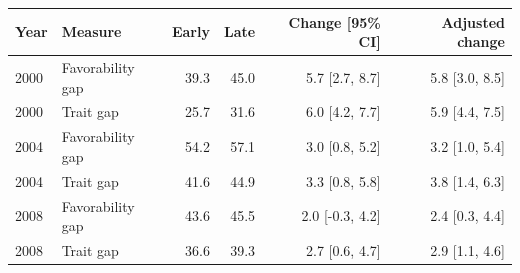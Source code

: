 \begin{tabular}{llrrrr}
\toprule
Year & Measure & Early & Late & Change [95\% CI] & Adjusted change \\
\midrule
2000 & Favorability gap & 39.3 & 45.0 & 5.7 [2.7, 8.7] & 5.8 [3.0, 8.5] \\
2000 & Trait gap & 25.7 & 31.6 & 6.0 [4.2, 7.7] & 5.9 [4.4, 7.5] \\
2004 & Favorability gap & 54.2 & 57.1 & 3.0 [0.8, 5.2] & 3.2 [1.0, 5.4] \\
2004 & Trait gap & 41.6 & 44.9 & 3.3 [0.8, 5.8] & 3.8 [1.4, 6.3] \\
2008 & Favorability gap & 43.6 & 45.5 & 2.0 [-0.3, 4.2] & 2.4 [0.3, 4.4] \\
2008 & Trait gap & 36.6 & 39.3 & 2.7 [0.6, 4.7] & 2.9 [1.1, 4.6] \\
\bottomrule
\end{tabular}
